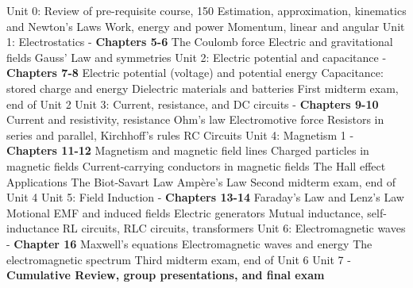 \documentclass[10pt]{article}
\begin{document}
\begin{outline}[enumerate]
\1 Unit 0: Review of pre-requisite course, 150
\2 Estimation, approximation, kinematics and Newton's Laws
\2 Work, energy and power
\2 Momentum, linear and angular
\1 Unit 1: Electrostatics - \textbf{Chapters 5-6}
\2 The Coulomb force
\2 Electric and gravitational fields
\2 Gauss' Law and symmetries
\1 Unit 2: Electric potential and capacitance - \textbf{Chapters 7-8}
\2 Electric potential (voltage) and potential energy
\2 Capacitance: stored charge and energy
\2 Dielectric materials and batteries
\1 First midterm exam, end of Unit 2
\1 Unit 3: Current, resistance, and DC circuits - \textbf{Chapters 9-10}
\2 Current and resistivity, resistance
\2 Ohm's law
\2 Electromotive force
\2 Resistors in series and parallel, Kirchhoff's rules
\2 RC Circuits
\1 Unit 4: Magnetism 1 - \textbf{Chapters 11-12}
\2 Magnetism and magnetic field lines
\2 Charged particles in magnetic fields
\2 Current-carrying conductors in magnetic fields
\2 The Hall effect
\2 Applications
\2 The Biot-Savart Law
\2 Amp\`{e}re's Law
\1 Second midterm exam, end of Unit 4
\1 Unit 5: Field Induction - \textbf{Chapters 13-14}
\2 Faraday's Law and Lenz's Law
\2 Motional EMF and induced fields
\2 Electric generators
\2 Mutual inductance, self-inductance
\2 RL circuits, RLC circuits, transformers
\1 Unit 6: Electromagnetic waves - \textbf{Chapter 16}
\2 Maxwell's equations
\2 Electromagnetic waves and energy
\2 The electromagnetic spectrum
\1 Third midterm exam, end of Unit 6
\1 Unit 7 - \textbf{Cumulative Review, group presentations, and final exam}
\end{outline}
\end{document}
